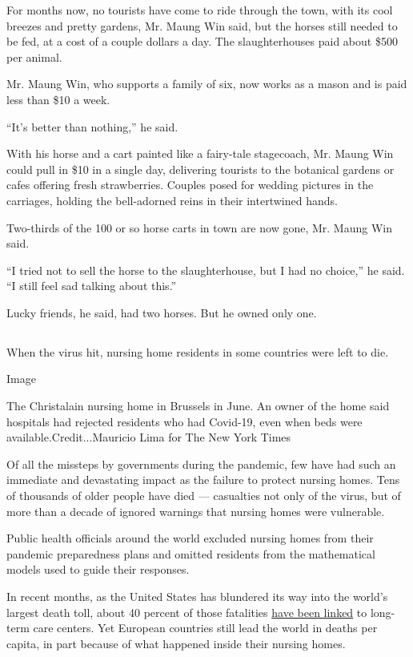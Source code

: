 For months now, no tourists have come to ride through the town, with its
cool breezes and pretty gardens, Mr. Maung Win said, but the horses
still needed to be fed, at a cost of a couple dollars a day. The
slaughterhouses paid about \$500 per animal.

Mr. Maung Win, who supports a family of six, now works as a mason and is
paid less than \$10 a week.

``It's better than nothing,'' he said.

With his horse and a cart painted like a fairy-tale stagecoach, Mr.
Maung Win could pull in \$10 in a single day, delivering tourists to the
botanical gardens or cafes offering fresh strawberries. Couples posed
for wedding pictures in the carriages, holding the bell-adorned reins in
their intertwined hands.

Two-thirds of the 100 or so horse carts in town are now gone, Mr. Maung
Win said.

``I tried not to sell the horse to the slaughterhouse, but I had no
choice,'' he said. ``I still feel sad talking about this.''

Lucky friends, he said, had two horses. But he owned only one.

\hypertarget{section-6}{%
\subsection{}\label{section-6}}

When the virus hit, nursing home residents in some countries were left
to die.

Image

The Christalain nursing home in Brussels in June. An owner of the home
said hospitals had rejected residents who had Covid-19, even when beds
were available.Credit...Mauricio Lima for The New York Times

Of all the missteps by governments during the pandemic, few have had
such an immediate and devastating impact as the failure to protect
nursing homes. Tens of thousands of older people have died ---
casualties not only of the virus, but of more than a decade of ignored
warnings that nursing homes were vulnerable.

Public health officials around the world excluded nursing homes from
their pandemic preparedness plans and omitted residents from the
mathematical models used to guide their responses.

In recent months, as the United States has blundered its way into the
world's largest death toll, about 40 percent of those fatalities
\href{https://www.kff.org/health-costs/issue-brief/state-data-and-policy-actions-to-address-coronavirus/\#stateleveldata}{have
been linked} to long-term care centers. Yet European countries still
lead the world in deaths per capita, in part because of what happened
inside their nursing homes.

